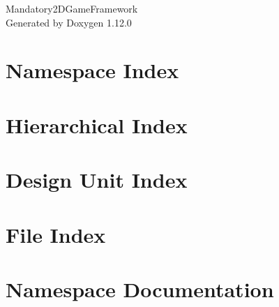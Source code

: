 \documentclass[twoside]{book}
\newcommand{\+}{\discretionary{\mbox{\scriptsize$\hookleftarrow$}}{}{}}
\newcommand{\clearemptydoublepage}{%
    \newpage{\pagestyle{empty}\cleardoublepage}%
  }
\begin{document}
  \raggedbottom
    \hypersetup{pageanchor=false,
                bookmarksnumbered=true,
                pdfencoding=unicode
               }
  \begin{titlepage}
  \vspace*{7cm}
  \begin{center}%
  {\Large Mandatory2\+DGame\+Framework}\\
  \vspace*{1cm}
  {\large Generated by Doxygen 1.12.0}\\
  \end{center}
  \end{titlepage}
  \clearemptydoublepage
  \tableofcontents
  \clearemptydoublepage
  \hypersetup{pageanchor=true}
\chapter{Namespace Index}

\chapter{Hierarchical Index}

\chapter{Design Unit Index}

\chapter{File Index}

\chapter{Namespace Documentation}















\end{document}
